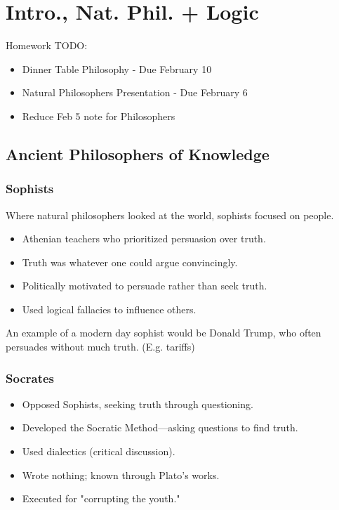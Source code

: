 
\chapter{Intro., Nat. Phil. + Logic}

Homework TODO:
\begin{itemize}
    \item Dinner Table Philosophy - Due February 10
    \item Natural Philosophers Presentation - Due February 6
    \item Reduce Feb 5 note for Philosophers
\end{itemize}

\section{Ancient Philosophers of Knowledge}

\subsection{Sophists}

Where natural philosophers looked at the world, sophists focused on people.

\begin{itemize}
    \item Athenian teachers who prioritized persuasion over truth.
    \item Truth was whatever one could argue convincingly.
    \item Politically motivated to persuade rather than seek truth.
    \item Used logical fallacies to influence others.
\end{itemize}

An example of a modern day sophist would be Donald Trump, who often persuades
without much truth. (E.g. tariffs)

\subsection{Socrates}

\begin{itemize}
    \item Opposed Sophists, seeking truth through questioning.
    \item Developed the Socratic Method—asking questions to find truth.
    \item Used dialectics (critical discussion).
    \item Wrote nothing; known through Plato’s works.
    \item Executed for "corrupting the youth."
\end{itemize}

